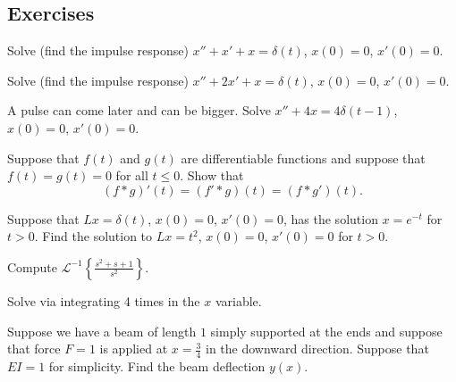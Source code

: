 \subsection{Exercises}

\begin{exercise}
Solve (find the impulse response)
$x'' + x' + x = \delta(t)$, $x(0) = 0$, $x'(0)=0$.
\end{exercise}

\begin{exercise}
Solve (find the impulse response)
$x'' + 2 x' + x = \delta(t)$, $x(0) = 0$, $x'(0)=0$.
\end{exercise}

\begin{exercise}
A pulse can come later and can be bigger.
Solve 
$x'' + 4 x = 4\delta(t-1)$, $x(0) = 0$, $x'(0)=0$.
\end{exercise}

\begin{exercise}
Suppose that $f(t)$ and $g(t)$ are differentiable functions
and suppose that $f(t) = g(t) = 0$ for all $t \leq 0$.  Show that
\begin{equation*}
(f * g)'(t) = (f' * g)(t) = (f * g')(t) .
\end{equation*}
\end{exercise}

\begin{exercise}
Suppose that $L x = \delta(t)$, $x(0) = 0$, $x'(0) = 0$, has the solution
$x = e^{-t}$ for $t > 0$.  Find the solution to
$Lx = t^2$, $x(0) = 0$, $x'(0) = 0$ for $t > 0$.
\end{exercise}

\begin{exercise}
Compute
${\mathcal{L}}^{-1} \left\{ \frac{s^2+s+1}{s^2} \right\}$.
\end{exercise}

\begin{exercise}[challenging]
Solve  via integrating 4 times in the $x$ variable.
\end{exercise}

\begin{exercise}
Suppose we have a beam of length $1$ simply supported at the ends and
suppose that force $F=1$ is applied at $x=\frac{3}{4}$ in the downward
direction.  Suppose that $EI=1$ for simplicity.  Find the beam deflection
$y(x)$.
\end{exercise}

\setcounter{exercise}{100}

